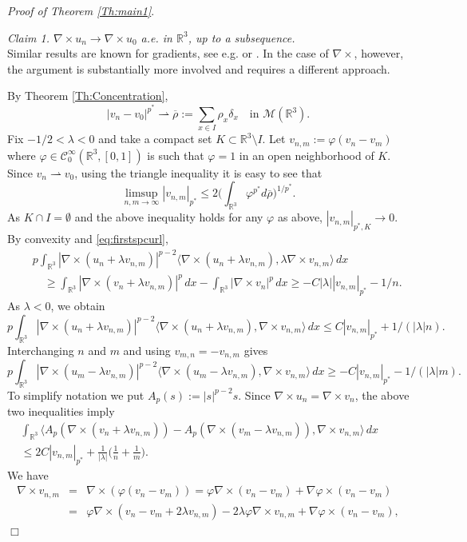 \documentclass[12pt,leqno,twoside]{amsart}
\newenvironment{altproof}[1]
{\noindent%
{\em Proof of {#1}}.}
{\nopagebreak\mbox{}\hfill $\Box$\par\addvspace{0.5cm}}
\newcommand{\vp}{\varphi}
\def\R{\mathbb{R}}
\def\rh{\rightharpoonup}
\newcommand{\cC}{{\mathcal C}}
\newcommand{\cM}{{\mathcal M}}
\def\r{\mathbb{R}}
\def\r3{\mathbb{R}^3}
\def\rh{\rightharpoonup}
\def\ir3{\int_{\r3}}
\def\vp{\varphi}
\def\ol{\overline}
\def\curlop{\nabla\times}
\numberwithin{equation}{section}
\begin{document}
\begin{altproof}{Theorem \ref{Th:main1}}
\medskip

{\em Claim 1. $\curlop u_n\to\curlop u_0$ a.e. in $\R^3$, up to a subsequence.}\\
Similar results are known for gradients, see e.g. \cite{BoccardoMurat} or \cite{SzulkinWillem}.  In the case of $\curlop$, however, the argument is substantially more involved and requires a different approach.

By Theorem \ref{Th:Concentration}, 
\[|v_n-v_0|^{p^*}\rh \ol\rho := \sum_{x\in I}\rho_x\delta_x \quad \text{in } \cM(\r3). 
\]
Fix $-1/2<\lambda<0$ and take a compact set $K\subset \r3\setminus I$. Let $v_{n,m} := \vp(v_n-v_m)$ where $\vp\in\cC_0^\infty(\r3,[0,1])$ is such that $\vp=1$ in an open neighborhood of $K$. Since $v_n\rh v_0$, using the triangle inequality it is easy to see that
\[
\limsup_{n,m\to\infty}|v_{n,m}|_{p^*}\le 2\Big(\ir3\vp^{p^*}d\ol\rho\Big)^{1/p^*}.
\]
As $K\cap I=\emptyset$ and the above inequality holds for any $\vp$ as above, $|v_{n,m}|_{p^*, K}\to 0$.
By convexity and \eqref{eq:firstspcurl},
\begin{eqnarray*}
&&p\int_{\R^3}|\curlop (u_n+\lambda v_{n,m})|^{p-2}\langle \curlop (u_n +\lambda v_{n,m}), \lambda \curlop  v_{n,m}\rangle\,dx \\ 
&&\quad \ge \ir3|\curlop (v_n+\lambda v_{n,m})|^p\,dx - \ir3|\curlop v_n|^p\,dx \ge -C|\lambda| |v_{n,m}|_{p^*}-1/n.
\end{eqnarray*}
As $\lambda<0$, we obtain
\[
p\int_{\R^3}|\curlop (u_n+\lambda v_{n,m})|^{p-2}\langle \curlop (u_n + \lambda v_{n,m}), \curlop  v_{n,m}\rangle\,dx \le C |v_{n,m}|_{p^*}+1/(|\lambda|n).
\]
Interchanging $n$ and $m$ and using $v_{m,n}=-v_{n,m}$ gives
\[
p\int_{\R^3}|\curlop (u_m-\lambda v_{n,m})|^{p-2}\langle \curlop (u_m -\lambda v_{n,m}), \curlop  v_{n,m}\rangle\,dx \ge -C |v_{n,m}|_{p^*}-1/(|\lambda|m).
\]
To simplify notation we put $A_p(s) := |s|^{p-2}s$. Since $\curlop u_n = \curlop v_n$, the above two inequalities imply 
\begin{eqnarray}\label{Apineq}
\int_{\R^3}\langle A_p(\curlop (v_n +\lambda v_{n,m})) - A_p(\curlop (v_m -\lambda v_{n,m})), \curlop  v_{n,m}\rangle\,dx && \\
\le 2C|v_{n,m}|_{p^*}+\frac{1}{|\lambda|}\Big(\frac1n+\frac1m\Big). \nonumber &&
\end{eqnarray} 
We have
\begin{eqnarray*} 
\curlop v_{n,m} & = & \curlop(\vp(v_n-v_m)) = \vp\curlop(v_n-v_m) + \nabla\vp\times(v_n-v_m) \\\nonumber
&=& \vp\curlop(v_n-v_m+2\lambda v_{n,m}) -2\lambda\vp\curlop v_{n,m} + \nabla\vp\times(v_n-v_m),\nonumber

\end{eqnarray*}
\end{altproof}
\end{document}

